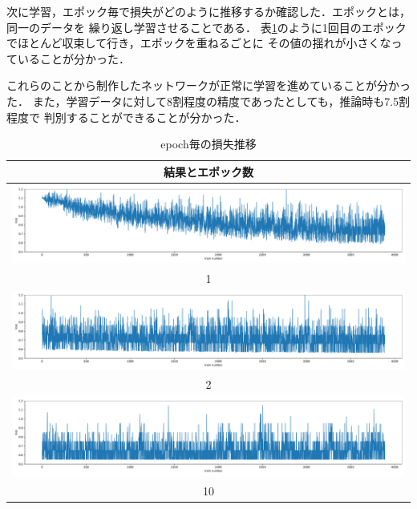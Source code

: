 次に学習，エポック毎で損失がどのように推移するか確認した．エポックとは，同一のデータを
繰り返し学習させることである．
表\ref{epoch}のように1回目のエポックでほとんど収束して行き，エポックを重ねるごとに
その値の揺れが小さくなっていることが分かった．

これらのことから制作したネットワークが正常に学習を進めていることが分かった．
また，学習データに対して8割程度の精度であったとしても，推論時も7.5割程度で
判別することができることが分かった．

\begin{table}[b]
  \centering
  \begin{tabular}{|c|} \hline
    結果とエポック数 \\ \hline
    \includegraphics[width=130mm]{images/net_result/epoch_1.pdf}
    \\ 1 \\ \hline
    \includegraphics[width=130mm]{images/net_result/epoch_2.pdf}
    \\ 2 \\ \hline
    \includegraphics[width=130mm]{images/net_result/epoch_10.pdf}
    \\ 10 \\ \hline
  \end{tabular}
  \caption{epoch毎の損失推移}
  \label{epoch}
\end{table}
\clearpage